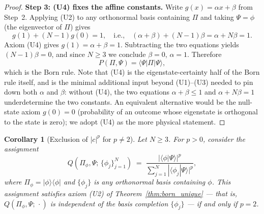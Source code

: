 \documentclass[12pt]{article}
\newtheorem{corollary}[theorem]{Corollary}
\begin{document}
\begin{proof}
\textbf{Step 3: (U4) fixes the affine constants.} Write $g(x) = \alpha x + \beta$ from Step~2. Applying (U2) to any orthonormal basis containing $\Pi$ and taking $\Psi = \phi$ (the eigenvector of $\Pi$) gives
\begin{equation}
    g(1) + (N-1) g(0) = 1, \quad \text{i.e.,} \quad (\alpha + \beta) + (N-1)\beta = \alpha + N\beta = 1.
\end{equation}
Axiom (U4) gives $g(1) = \alpha + \beta = 1$. Subtracting the two equations yields $(N-1)\beta = 0$, and since $N \geq 3$ we conclude $\beta = 0$, $\alpha = 1$. Therefore
\begin{equation}
    P(\Pi, \Psi) = \langle\Psi|\Pi|\Psi\rangle,
\end{equation}
which is the Born rule. Note that (U4) is the eigenstate-certainty half of the Born rule itself, and is the minimal additional input beyond (U1)--(U3) needed to pin down both $\alpha$ and $\beta$: without (U4), the two equations $\alpha + \beta \leq 1$ and $\alpha + N\beta = 1$ underdetermine the two constants. An equivalent alternative would be the null-state axiom $g(0) = 0$ (probability of an outcome whose eigenstate is orthogonal to the state is zero); we adopt (U4) as the more physical statement.
\end{proof}

\begin{corollary}[Exclusion of $|c|^p$ for $p \neq 2$]\label{cor:p_excluded}
Let $N \geq 3$. For $p > 0$, consider the assignment
\begin{equation}
    Q(\Pi_\phi, \Psi;\, \{\phi_j\}_{j=1}^{N}) \;=\; \frac{|\langle\phi|\Psi\rangle|^p}{\sum_{j=1}^{N} |\langle\phi_j|\Psi\rangle|^p},
\end{equation}
where $\Pi_\phi = |\phi\rangle\langle\phi|$ and $\{\phi_j\}$ is any orthonormal basis containing $\phi$. This assignment satisfies axiom (U2) of Theorem~\ref{thm:born_unique} --- that is, $Q(\Pi_\phi, \Psi;\, \cdot)$ is independent of the basis completion $\{\phi_j\}$ --- if and only if $p = 2$.
\end{corollary}
\end{document}
